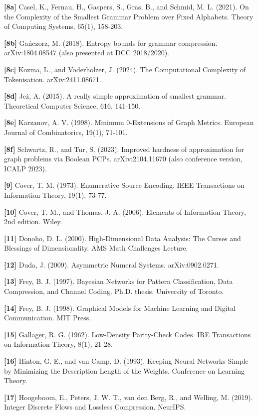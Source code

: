 \documentclass[
]{article}
\begin{document}
\textbf{{[}8a{]}} Casel, K., Fernau, H., Gaspers, S., Gras, B., and
Schmid, M. L. (2021). On the Complexity of the Smallest Grammar Problem
over Fixed Alphabets. Theory of Computing Systems, 65(1), 158-203.

\textbf{{[}8b{]}} Ga\'nczorz, M. (2018). Entropy bounds for grammar
compression. arXiv:1804.08547 (also presented at DCC 2018/2020).

\textbf{{[}8c{]}} Kozma, L., and Voderholzer, J. (2024). The
Computational Complexity of Tokenisation. arXiv:2411.08671.

\textbf{{[}8d{]}} Je\.z, A. (2015). A really simple approximation of
smallest grammar. Theoretical Computer Science, 616, 141-150.

\textbf{{[}8e{]}} Karzanov, A. V. (1998). Minimum 0-Extensions of Graph
Metrics. European Journal of Combinatorics, 19(1), 71-101.

\textbf{{[}8f{]}} Schwartz, R., and Tur, S. (2023). Improved hardness
of approximation for graph problems via Boolean PCPs.
arXiv:2104.11670 (also conference version, ICALP 2023).

\textbf{{[}9{]}} Cover, T. M. (1973). Enumerative Source Encoding. IEEE
Transactions on Information Theory, 19(1), 73-77.

\textbf{{[}10{]}} Cover, T. M., and Thomas, J. A. (2006). Elements of
Information Theory, 2nd edition. Wiley.

\textbf{{[}11{]}} Donoho, D. L. (2000). High-Dimensional Data Analysis:
The Curses and Blessings of Dimensionality. AMS Math Challenges Lecture.

\textbf{{[}12{]}} Duda, J. (2009). Asymmetric Numeral Systems.
arXiv:0902.0271.

\textbf{{[}13{]}} Frey, B. J. (1997). Bayesian Networks for Pattern
Classification, Data Compression, and Channel Coding. Ph.D. thesis,
University of Toronto.

\textbf{{[}14{]}} Frey, B. J. (1998). Graphical Models for Machine
Learning and Digital Communication. MIT Press.

\textbf{{[}15{]}} Gallager, R. G. (1962). Low-Density Parity-Check
Codes. IRE Transactions on Information Theory, 8(1), 21-28.

\textbf{{[}16{]}} Hinton, G. E., and van Camp, D. (1993). Keeping Neural
Networks Simple by Minimizing the Description Length of the Weights.
Conference on Learning Theory.

\textbf{{[}17{]}} Hoogeboom, E., Peters, J. W. T., van den Berg, R., and
Welling, M. (2019). Integer Discrete Flows and Lossless Compression.
NeurIPS.
\end{document}
